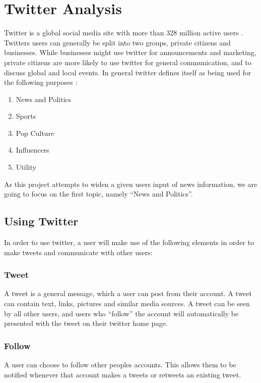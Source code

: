 \section{Twitter Analysis}\label{sec:twitter-analysis}
Twitter is a global social media site with more than 328 million active users
\citep{aboutTwitter}. Twitters users can generally be split into two groups,
private citizens and businesses. While businesses might use twitter for
announcements and marketing, private citizens are more likely to use
twitter for general communication, and to discuss global and local events. In
general twitter defines itself as being used for the following purposes
\citep{StartingTwitter}:

\begin{enumerate}
  \item News and Politics
  \item Sports
  \item Pop Culture
  \item Influencers
  \item Utility
\end{enumerate} 

As this project attempts to widen a given users input of news information, we
are going to focus on the first topic, namely ``News and Politics''.

\subsection{Using Twitter}
In order to use twitter, a user will make use of the following elements
\citep{StartingTwitter} in order to make tweets and communicate with other
users:

\subsubsection{Tweet}
A tweet is a general message, which a user can post from their account. A tweet
can contain text, links, pictures and similar media sources. A tweet can be seen
by all other users, and users who ``follow'' the account will automatically be
presented with the tweet on their twitter home page.

\subsubsection{Follow}
A user can choose to follow other peoples accounts. This allows them to be
notified whenever that account makes a tweets or retweets an existing tweet.

